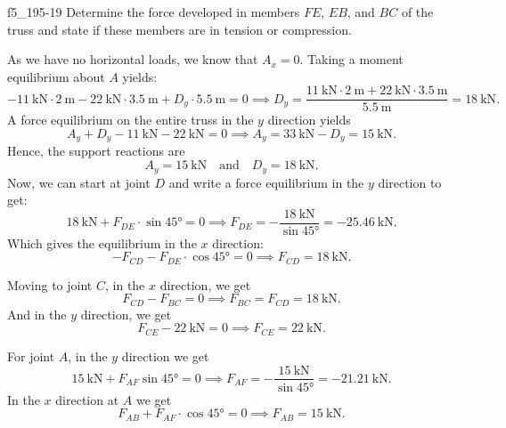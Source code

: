 
\begin{problemwithimage}{f5_19}{5-19}
  Determine the force developed in members $FE$, $EB$, and $BC$ of the truss and state if these members are in tension or compression.
\end{problemwithimage}

\begin{derivation}
  As we have no horizontal loads, we know that $A_x = 0$.
  Taking a moment equilibrium about $A$ yields:
  \begin{equation*}
    - \qty{11}{\kN} \cdot \qty{2}{\m} - \qty{22}{\kN} \cdot \qty{3.5}{\m} + D_y \cdot \qty{5,5}{\m} = 0 \implies D_y = \frac{\qty{11}{\kN} \cdot \qty{2}{\m} + \qty{22}{\kN} \cdot \qty{3.5}{\m} }{\qty{5.5}{\m} } = \qty{18}{\kN}
  .\end{equation*}
  A force equilibrium on the entire truss in the $y$ direction yields
  \begin{equation*}
    A_y + D_y - \qty{11}{\kN} - \qty{22}{\kN} = 0 \implies A_y = \qty{33}{\kN} - D_y = \qty{15}{\kN} 
  .\end{equation*}
  Hence, the support reactions are
  \begin{equation*}
    A_y = \qty{15}{\kN} \quad \text{and} \quad D_y = \qty{18}{\kN} 
  .\end{equation*}
  Now, we can start at joint $D$ and write a force equilibrium in the $y$ direction to get:
  \begin{equation*}
    \qty{18}{\kN} + F_{DE} \cdot \sin \ang{45} = 0 \implies F_{DE} = - \frac{\qty{18}{\kN}}{\sin \ang{45} }  = - \qty{25,46}{\kN}
  .\end{equation*}
  Which gives the equilibrium in the $x$ direction:
  \begin{equation*}
    - F_{CD} - F_{DE} \cdot \cos \ang{45} = 0 \implies F_{CD} = \qty{18}{\kN} 
  .\end{equation*}
  
  Moving to joint $C$, in the $x$ direction, we get
  \begin{equation*}
    F_{CD} - F_{BC} = 0 \implies F_{BC} = F_{CD} = \qty{18}{\kN} 
  .\end{equation*}
  And in the $y$ direction, we get
  \begin{equation*}
    F_{CE} - \qty{22}{\kN} = 0 \implies F_{CE} = \qty{22}{\kN} 
  .\end{equation*}
  
  For joint $A$, in the $y$ direction we get
  \begin{equation*}
    \qty{15}{\kN} + F_{AF} \sin \ang{45} = 0 \implies F_{AF} = - \frac{\qty{15}{\kN} }{\sin \ang{45}} = - \qty{21,21}{\kN} 
  .\end{equation*}
  In the $x$ direction at $A$ we get
  \begin{equation*}
    F_{AB} + F_{AF} \cdot \cos \ang{45} = 0 \implies F_{AB} = \qty{15}{\kN} 
  .\end{equation*}
  

\end{derivation}

